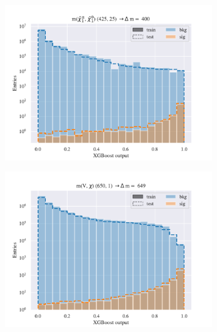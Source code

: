 \begin{figure}[H]
\begin{subfigure}[t!]{0.49\textwidth}
        \includegraphics[width = \textwidth]{Figures/WW/BDT/Low_level/High/scaled_train_test_395330.pdf}
        \caption{}
        \label{fig:traintestscaled}
    \end{subfigure}
    \begin{subfigure}[t!]{0.49\textwidth}
        \includegraphics[width = \textwidth]{Figures/Mono_Z/ML/BDT/Low_level/High/scaled_train_test_310617.pdf}
        \caption{}
        \label{fig:ROCBDTLow_low_level}
    \end{subfigure}
    \caption{}
    \label{fig:Non}
\end{figure}









